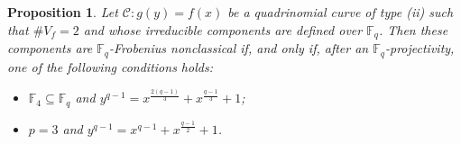 \documentclass[preprint,12pt]{elsarticle}
\newtheorem{proposition}[theorem]{Proposition}
\begin{document}
\begin{proposition}
Let $\mathcal{C} \colon g(y) = f(x)$ be a quadrinomial curve of type (ii) such that $\# V_f = 2$ and whose irreducible components are defined over $\mathbb{F}_q$. Then these components are $\mathbb{F}_q$-Frobenius nonclassical if, and only if, after an $\mathbb{F}_q$-projectivity, one of the following conditions holds:
\begin{itemize}
    \item[(i)] $\mathbb{F}_4 \subseteq \mathbb{F}_q$ and $y^{q - 1} = x^{\frac{2(q - 1)}{3}} + x^{\frac{q - 1}{3}} + 1$;
    \item[(ii)] $p = 3$ and $y^{q - 1} = x^{q - 1} + x^{\frac{q - 1}{2}} + 1$.
\end{itemize}
\end{proposition}
\end{document}

